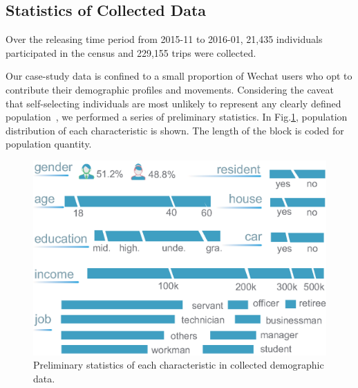 \documentclass{ieeeaccess}
\begin{document}
\subsection{Statistics of Collected Data}

Over the releasing time period from 2015-11 to 2016-01, 21,435 individuals participated in the census and 229,155 trips were collected.

Our case-study data is confined to a small proportion of Wechat users who opt to contribute their demographic profiles and movements. Considering the caveat that self-selecting individuals are most unlikely to represent any clearly defined population~\cite{Longley2015}, we performed a series of preliminary statistics. In Fig.\ref{fig:data_overview}, population distribution of each characteristic is shown. The length of the block is coded for population quantity.

\begin{figure}[htb!]
 \centering %
 \includegraphics[width=\columnwidth]{pictures/data_overview}
 \caption{Preliminary statistics of each characteristic in collected demographic data.}
 \label{fig:data_overview}
\end{figure}
\end{document}
